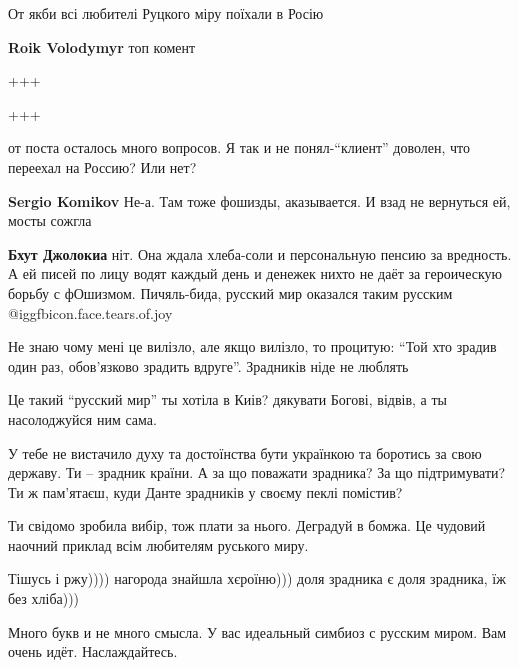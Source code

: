 \begin{itemize}
От якби всі любителі Руцкого міру поїхали в Росію

\begin{itemize} %
\textbf{Roik Volodymyr} топ комент

+++

+++
\end{itemize} %


от поста осталось много вопросов. Я так и не понял-\enquote{клиент} доволен, что
переехал на Россию? Или нет?

\begin{itemize} %
\textbf{Sergio Komikov} Не-а. Там тоже фошизды, аказывается. И взад не вернуться ей, мосты сожгла

\textbf{Бхут Джолокиа} ніт. Она ждала хлеба-соли и персональную пенсию за вредность. А ей писей по лицу водят каждый день и денежек нихто не даёт за героическую борьбу с фОшизмом. Пичяль-бида, русский мир оказался таким русским @igg{fbicon.face.tears.of.joy} 
\end{itemize} %


Не знаю чому мені це вилізло, але якщо вилізло, то процитую: \enquote{Той хто зрадив
один раз, обов'язково зрадить вдруге}. Зрадників ніде не люблять


Це такий \enquote{русский мир} ты хотіла в Киів? дякувати Богові, відвів, а ты насолоджуйся ним сама.


У тебе не вистачило духу та достоїнства бути українкою та боротись за свою
державу. Ти – зрадник країни. А за що поважати зрадника? За що підтримувати? Ти
ж пам'ятаєш, куди Данте зрадників у своєму пеклі помістив?

Ти свідомо зробила вибір, тож плати за нього. Деградуй в бомжа. Це чудовий
наочний приклад всім любителям руського миру.


Тішусь і ржу)))) нагорода знайшла хєроїню))) доля зрадника є доля зрадника, їж без хліба)))


Много букв и не много смысла. У вас идеальный симбиоз с русским миром. Вам
очень идёт. Наслаждайтесь.



\end{itemize}
